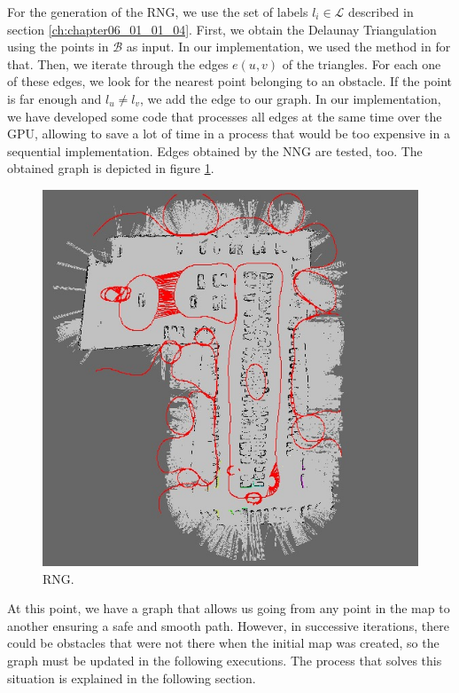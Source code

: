 For the generation of the \ac{RNG}, we use the set of labels $l_i \in \mathcal{L}$ described in section \ref{ch:chapter06_01_01_04}. First, we obtain the Delaunay Triangulation \cite{su1997comparison} using the points in $\mathcal{B}$ as input. In our implementation, we used the method in \cite{rong2008computing} for that. Then, we iterate through the edges $e(u,v)$ of the triangles. For each one of these edges, we look for the nearest point belonging to an obstacle. If the point is far enough and $l_u \neq l_v$, we add the edge to our graph. In our implementation, we have developed some code that processes all edges at the same time over the \acf{GPU}, allowing to save a lot of time in a process that would be too expensive in a sequential implementation. Edges obtained by the \ac{NNG} are tested, too. The obtained graph is depicted in figure \ref{fig:cp06_rng}.

\begin{figure}[h!]
  \centering
  \includegraphics[width=\textwidth, trim=0 0 0 0,clip]{figure4}
  \caption{\acf{RNG}.}
  \label{fig:cp06_rng}
\end{figure}%

At this point, we have a graph that allows us going from any point in the map to another ensuring a safe and smooth path. However, in successive iterations, there could be obstacles that were not there when the initial map was created, so the graph must be updated in the following executions. The process that solves this situation is explained in the following section.

